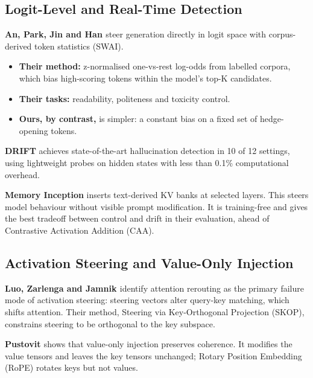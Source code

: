 \documentclass[11pt,letterpaper]{article}
\providecommand{\tightlist}{\setlength{\itemsep}{0pt}\setlength{\parskip}{0pt}}
\DeclareRobustCommand{\_}{\textunderscore\allowbreak}
\begin{document}
\hypertarget{logit-level-and-real-time-detection}{%
\subsection{Logit-Level and Real-Time Detection}\label{logit-level-and-real-time-detection}}

\textbf{An, Park, Jin and Han \cite{an2026steering}} steer generation directly in logit space with corpus-derived token statistics (SWAI).

\begin{itemize}
\tightlist
\item
  \textbf{Their method:} z-normalised one-vs-rest log-odds from labelled corpora, which bias high-scoring tokens within the model's top-K candidates.
\item
  \textbf{Their tasks:} readability, politeness and toxicity control.
\item
  \textbf{Ours, by contrast,} is simpler: a constant bias on a fixed set of hedge-opening tokens.
\end{itemize}

\textbf{DRIFT} \cite{bhatnagar2026drift} achieves state-of-the-art hallucination detection in 10 of 12 settings, using lightweight probes on hidden states with less than 0.1\% computational overhead.

\textbf{Memory Inception} \cite{liu2026memory} inserts text-derived KV banks at selected layers. This steers model behaviour without visible prompt modification. It is training-free and gives the best tradeoff between control and drift in their evaluation, ahead of Contrastive Activation Addition (CAA).

\hypertarget{activation-steering-and-value-only-injection}{%
\subsection{Activation Steering and Value-Only Injection}\label{activation-steering-and-value-only-injection}}

\textbf{Luo, Zarlenga and Jamnik \cite{luo2026dont}} identify attention rerouting as the primary failure mode of activation steering: steering vectors alter query-key matching, which shifts attention. Their method, Steering via Key-Orthogonal Projection (SKOP), constrains steering to be orthogonal to the key subspace.

\textbf{Pustovit \cite{pustovit2026knowledge}} shows that value-only injection preserves coherence. It modifies the value tensors and leaves the key tensors unchanged; Rotary Position Embedding (RoPE) rotates keys but not values.
\end{document}
